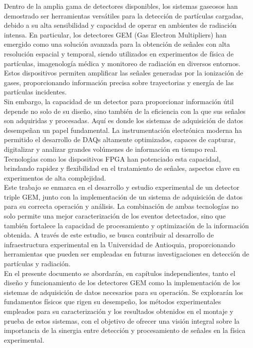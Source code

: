 \documentclass{report}
\begin{document}
\noindent Dentro de la amplia gama de detectores disponibles, los sistemas gaseosos han demostrado ser herramientas versátiles para la detección de partículas cargadas, debido a su alta sensibilidad y capacidad de operar en ambientes de radiación intensa. En particular, los detectores GEM (Gas Electron Multipliers) han emergido como una solución avanzada para la obtención de señales con alta resolución espacial y temporal, siendo utilizados en experimentos de física de partículas, imagenología médica y monitoreo de radiación en diversos entornos. Estos dispositivos permiten amplificar las señales generadas por la ionización de gases, proporcionando información precisa sobre trayectorias y energía de las partículas incidentes.\\

\noindent Sin embargo, la capacidad de un detector para proporcionar información útil depende no solo de su diseño, sino también de la eficiencia con la que sus señales son adquiridas y procesadas. Aquí es donde los sistemas de adquisición de datos desempeñan un papel fundamental. La instrumentación electrónica moderna ha permitido el desarrollo de DAQs altamente optimizados, capaces de capturar, digitalizar y analizar grandes volúmenes de información en tiempo real. Tecnologías como los dispositivos FPGA han potenciado esta capacidad, brindando rapidez y flexibilidad en el tratamiento de señales, aspectos clave en experimentos de alta complejidad.\\

\noindent Este trabajo se enmarca en el desarrollo y estudio experimental de un detector triple GEM, junto con la implementación de un sistema de adquisición de datos para su correcta operación y análisis. La combinación de ambas tecnologías no solo permite una mejor caracterización de los eventos detectados, sino que también fortalece la capacidad de procesamiento y optimización de la información obtenida. A través de este estudio, se busca contribuir al desarrollo de infraestructura experimental en la Universidad de Antioquia, proporcionando herramientas que pueden ser empleadas en futuras investigaciones en detección de partículas y radiación.\\

\noindent En el presente documento se abordarán, en capítulos independientes, tanto el diseño y funcionamiento de los detectores GEM como la implementación de los sistemas de adquisición de datos necesarios para su operación. Se explorarán los fundamentos físicos que rigen su desempeño, los métodos experimentales empleados para su caracterización y los resultados obtenidos en el montaje y prueba de estos sistemas, con el objetivo de ofrecer una visión integral sobre la importancia de la sinergia entre detección y procesamiento de señales en la física experimental.
\end{document}
